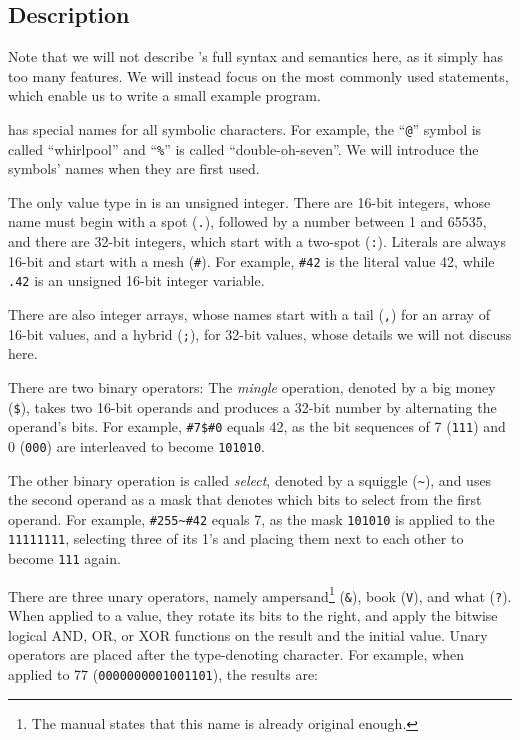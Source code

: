 \subsection{Description}

Note that we will not describe \ic{}'s full syntax and semantics here, as it simply has too many features. We will instead focus on the most commonly used statements, which enable us to write a small example program.

\ic{} has special names for all symbolic characters. For example, the “\texttt{@}” symbol is called “whirlpool” and “\texttt{\%}” is called “double-oh-seven”. We will introduce the symbols' names when they are first used.

The only value type in \ic{} is an unsigned integer. There are 16-bit integers, whose name must begin with a spot (\texttt{.}), followed by a number between 1 and 65535, and there are 32-bit integers, which start with a two-spot (\texttt{:}). Literals are always 16-bit and start with a mesh (\texttt{\#}). For example, \texttt{\#42} is the literal value 42, while \texttt{.42} is an unsigned 16-bit integer variable.

There are also integer arrays, whose names start with a tail (\texttt{,}) for an array of 16-bit values, and a hybrid (\texttt{;}), for 32-bit values, whose details we will not discuss here.

There are two binary operators: The \emph{mingle} operation, denoted by a big money (\texttt{\$}), takes two 16-bit operands and produces a 32-bit number by alternating the operand's bits. For example, \texttt{\#7\$\#0} equals 42, as the bit sequences of 7 (\texttt{111}) and 0 (\texttt{000}) are interleaved to become \texttt{101010}.

The other binary operation is called \emph{select}, denoted by a squiggle (\texttt{\~}), and uses the second operand as a mask that denotes which bits to select from the first operand. For example, \texttt{\#255\~{}\#42} equals 7, as the mask \texttt{101010} is applied to the \texttt{11111111}, selecting three of its 1's and placing them next to each other to become \texttt{111} again.

There are three unary operators, namely ampersand\footnote{The manual states that this name is already original enough.} (\texttt{\&}), book (\texttt{V}), and what (\texttt{?}). When applied to a value, they rotate its bits to the right, and apply the bitwise logical AND, OR, or XOR functions on the result and the initial value. Unary operators are placed after the type-denoting character. For example, when applied to 77 (\texttt{0000000001001101}), the results are:

